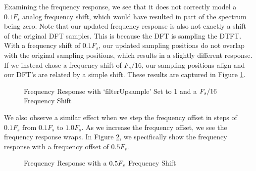 \documentclass{article}
\begin{document}
\noindent Examining the frequency response, we see that it does not correctly model a $0.1F_s$ analog frequency shift, which would have resulted in part of the spectrum being zero. Note that our updated frequency response is also not exactly a shift of the original DFT samples. This is because the DFT is sampling the DTFT. With a frequency shift of $0.1F_s$, our updated sampling positions do not overlap with the original sampling positions, which results in a slightly different response. If we instead chose a frequency shift of $F_s/16$, our sampling positions align and our DFT's are related by a simple shift. These results are captured in Figure \ref{fig::psd_upsample_1_mod_shift}.

\begin{figure}[H]
	\centerline{}
	\caption{Frequency Response with `filterUpsample' Set to 1 and a $\protect{F_s/16}$ Frequency Shift}
	\label{fig::psd_upsample_1_mod_shift}
\end{figure}

\noindent We also observe a similar effect when we step the frequency offset in steps of $0.1F_s$ from $0.1F_s$ to $1.0F_s$. As we increase the frequency offset, we see the frequency response wraps. In Figure \ref{fig::psd_freq_offset_05}, we specifically show the frequency response with a frequency offset of $0.5F_s$. 

\begin{figure}[H]
	\centerline{}
	\caption{Frequency Response with a $\protect{0.5F_s}$ Frequency Shift}
	\label{fig::psd_freq_offset_05}
\end{figure}
\end{document}
